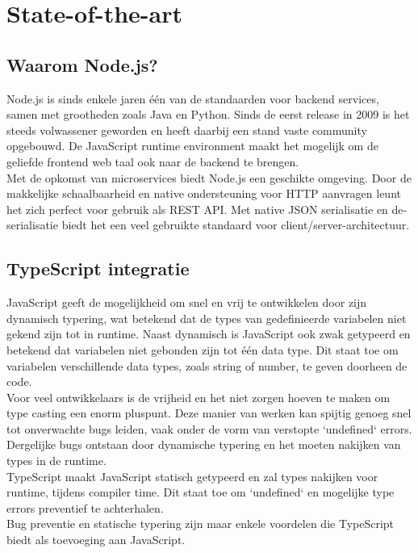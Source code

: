 
\section{State-of-the-art}
\label{sec:state-of-the-art}


\subsection{Waarom Node.js?}

Node.js is sinds enkele jaren één van de standaarden voor backend services, samen met grootheden zoals Java en Python. Sinds de eerst release in 2009 is het steeds volwassener geworden en heeft daarbij een stand vaste community opgebouwd. De JavaScript runtime environment maakt het mogelijk om de geliefde frontend web taal ook naar de backend te brengen. \\
Met de opkomst van microservices biedt Node.js een geschikte omgeving. Door de makkelijke schaalbaarheid en native ondersteuning voor HTTP aanvragen leunt het zich perfect voor gebruik als REST API. Met native JSON serialisatie en de-serialisatie biedt het een veel gebruikte standaard voor client/server-architectuur.

\subsection{TypeScript integratie}

JavaScript geeft de mogelijkheid om snel en vrij te ontwikkelen door zijn dynamisch typering, wat betekend dat de types van gedefinieerde variabelen niet gekend zijn tot in runtime. Naast dynamisch is JavaScript ook zwak getypeerd en betekend dat variabelen niet gebonden zijn tot één data type. Dit staat toe om variabelen verschillende data types, zoals string of number, te geven doorheen de code. \\
Voor veel ontwikkelaars is de vrijheid en het niet zorgen hoeven te maken om type casting een enorm pluspunt. Deze manier van werken kan spijtig genoeg snel tot onverwachte bugs leiden, vaak onder de vorm van verstopte `undefined` errors. Dergelijke bugs ontstaan door dynamische typering en het moeten nakijken van types in de runtime. \\
TypeScript maakt JavaScript statisch getypeerd en zal types nakijken voor runtime, tijdens compiler time. Dit staat toe om `undefined` en mogelijke type errors preventief te achterhalen. \\
Bug preventie en statische typering zijn maar enkele voordelen die TypeScript biedt als toevoeging aan JavaScript.

